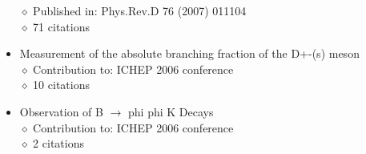 \documentclass[margin, 10pt]{res} %
\begin{document}
\begin{resume}
\begin{itemize}
    $\diamond$ Published in: Phys.Rev.D 76 (2007) 011104\\
    $\diamond$ 71 citations
    \item Measurement of the absolute branching fraction of the D+-(s) meson\\
    $\diamond$ Contribution to: ICHEP 2006 conference\\
    $\diamond$ 10 citations
    \item Observation of B $\rightarrow$ phi phi K Decays\\
    $\diamond$ Contribution to: ICHEP 2006 conference\\
    $\diamond$ 2 citations
\end{itemize}


\end{resume}
\end{document}
